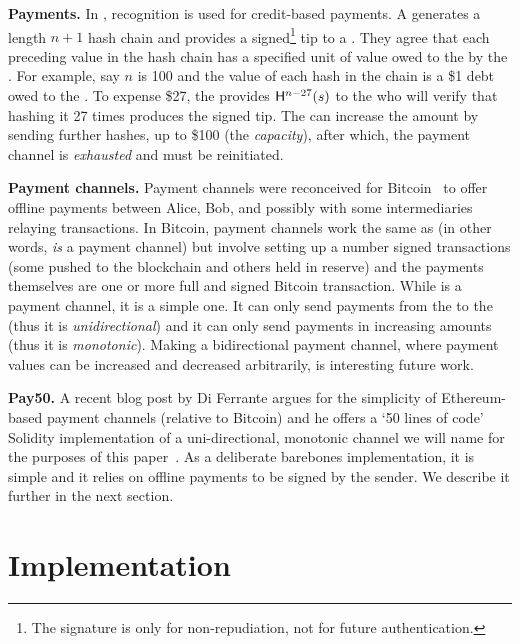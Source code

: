 \textbf{Payments.} In \pw, recognition is used for credit-based payments. A \make generates a length $n+1$ hash chain and provides a signed\footnote{The signature is only for non-repudiation, not for future authentication.} tip to a \take. They agree that each preceding value in the hash chain has a specified unit of value owed to the \take by the \make. For example, say $n$ is 100 and the value of each hash in the chain is a \$1 debt owed to the \take. To expense \$27, the \make provides $\mathsf{H}^{n-27}(s)$ to the \take who will verify that hashing it 27 times produces the signed tip. The \make can increase the amount by sending further hashes, up to \$100 (the \textit{capacity}), after which, the payment channel is \textit{exhausted} and must be reinitiated.

\textbf{Payment channels.} Payment channels were reconceived for Bitcoin~\cite{DW15,PD15} to offer offline payments between Alice, Bob, and possibly with some intermediaries relaying transactions. In Bitcoin, payment channels work the same as \ew (in other words, \ew \textit{is} a payment channel) but involve setting up a number signed transactions (some pushed to the blockchain and others held in reserve) and the payments themselves are one or more full and signed Bitcoin transaction. While \ew is a payment channel, it is a simple one. It can only send payments from the \make to the \take (thus it is \textit{unidirectional}) and it can only send payments in increasing amounts (thus it is \textit{monotonic}). Making a bidirectional payment channel, where payment values can be increased and decreased arbitrarily, is interesting future work.

\label{sec:pcn}

\textbf{Pay50.} A recent blog post by Di Ferrante argues for the simplicity of Ether\-eum-based payment channels (relative to Bitcoin) and he offers a `50 lines of code' Solidity implementation of a uni-directional, monotonic channel we will name \fifty for the purposes of this paper~\cite{DF17}. As a deliberate barebones implementation, it is simple and it relies on offline payments to be signed by the sender. We describe it further in the next section. 


\section{\ew Implementation}

